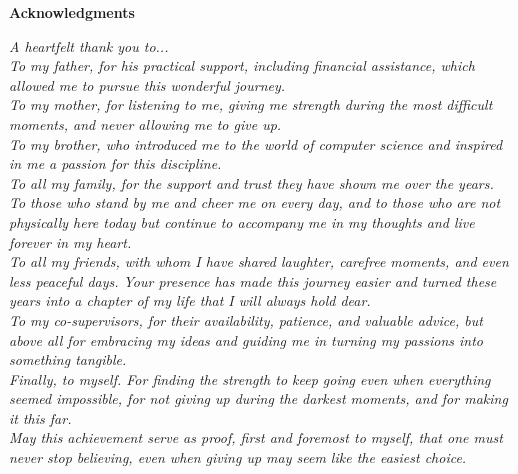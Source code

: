 \thispagestyle{empty}

\hypertarget{ringraziamenti}{}

\begin{center}
  {\bf \Huge Acknowledgments}
\end{center}

\vspace{4cm}

\noindent
	\emph{A heartfelt thank you to...\\[0.8em]
		To my father, for his practical support, including financial assistance, which allowed me to pursue this wonderful journey.\\[0.8em]
		To my mother, for listening to me, giving me strength during the most difficult moments, and never allowing me to give up.\\[0.8em]
		To my brother, who introduced me to the world of computer science and inspired in me a passion for this discipline.\\[0.8em]
		To all my family, for the support and trust they have shown me over the years.\\ To those who stand by me and cheer me on every day, and to those who are not physically here today but continue to accompany me in my thoughts and live forever in my heart.\\[0.8em]
		To all my friends, with whom I have shared laughter, carefree moments, and even less peaceful days. Your presence has made this journey easier and turned these years into a chapter of my life that I will always hold dear.\\[0.8em]
		To my co-supervisors, for their availability, patience, and valuable advice, but above all for embracing my ideas and guiding me in turning my passions into something tangible.\\[0.8em]
		Finally, to myself. For finding the strength to keep going even when everything seemed impossible, for not giving up during the darkest moments, and for making it this far.\\ May this achievement serve as proof, first and foremost to myself, that one must never stop believing, even when giving up may seem like the easiest choice.
}
